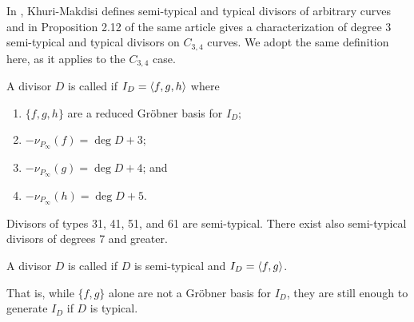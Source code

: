 In \cite{kmakdisi18}, Khuri-Makdisi defines semi-typical and typical divisors of arbitrary curves
and in Proposition 2.12 of the same article gives a characterization of degree 3 semi-typical and typical divisors on $C_{3,4}$ curves.
We adopt the same definition here, as it applies to the $C_{3,4}$ case.
\begin{definition}
  \label{def_semitypical_divisor}
  A divisor $D$ is called  if $I_D = \left\langle f, g, h \right\rangle$ where
  \begin{enumerate}[label=(\roman*)]
    \item $\{f, g, h\}$ are a reduced Gr\"obner basis for $I_D$;
    \item $-\nu_{P_\infty}(f) = \deg D + 3$;
    \item $-\nu_{P_\infty}(g) = \deg D + 4$; and
    \item $-\nu_{P_\infty}(h) = \deg D + 5$.
  \end{enumerate}
\end{definition}
Divisors of types 31, 41, 51, and 61 are semi-typical.
There exist also semi-typical divisors of degrees 7 and greater.
\begin{definition}
  \label{def_typical_divisor}
  A divisor $D$ is called  if $D$ is semi-typical and $I_D = \left\langle f, g \right\rangle$.
\end{definition}
That is, while $\{f, g\}$ alone are not a Gr\"obner basis for $I_D$,
they are still enough to generate $I_D$ if $D$ is typical.

